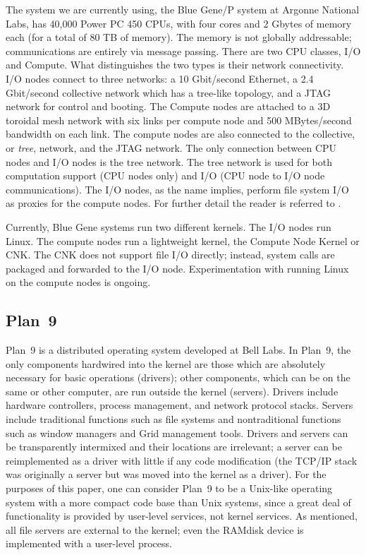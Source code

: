 \documentclass[letterpaper,twocolumn,10pt]{article}
\begin{document}
The system we are currently using, the Blue Gene/P system at Argonne National Labs, has 40,000 Power PC 450 CPUs, 
with four cores and 2 Gbytes of memory each (for a total of 80 TB of memory). The memory is not globally addressable; communications are entirely via message passing. 
There are two CPU classes, I/O and Compute. What distinguishes the two types is their network connectivity. I/O nodes connect
to three networks: a 10 Gbit/second Ethernet, a 2.4 Gbit/second collective network which has a tree-like topology, and
a JTAG network for control and booting. The Compute nodes are attached to a 3D toroidal mesh network with six links per compute node and 500 MBytes/second bandwidth on each link.  The compute nodes are also connected to the collective, or {\em tree}, network, and the JTAG network. The only connection between CPU nodes and I/O nodes is the tree network. The tree network is used for both computation support (CPU nodes only) and I/O (CPU node to I/O node communications). The I/O nodes, as the name implies, perform file system I/O as proxies for the 
compute nodes. For further detail the reader is referred to \cite{plan9bgp}. 

Currently, Blue Gene systems run two different kernels. The I/O nodes run Linux. The compute nodes run a lightweight kernel, the Compute Node Kernel or CNK. The CNK does not support file I/O directly; instead, system calls are packaged and forwarded to the I/O node. Experimentation with running Linux on the compute nodes is ongoing. 

\subsection{Plan~9}
Plan~9\cite{Plan9} is a distributed operating system developed at Bell Labs. In Plan~9, the only components hardwired into the kernel are those which are absolutely necessary for basic operations (drivers); other components, which can be on the same or other computer, are run outside the kernel (servers). Drivers include hardware controllers, process management, and network protocol stacks. Servers include traditional functions such as file systems and nontraditional functions such as window managers and Grid management tools. Drivers and servers can be transparently intermixed and their locations are 
irrelevant; a server can be reimplemented as a driver with little if any code modification (the TCP/IP stack was originally a server but was moved into the kernel as a driver). For the purposes of this paper, one can consider Plan~9 to be a Unix-like operating 
system with a more compact code base than Unix systems, since a great deal of functionality is provided by user-level services, not kernel services. As mentioned, all file servers are external to the kernel; even the 
RAMdisk 
device is implemented with a user-level process. 
\end{document}
